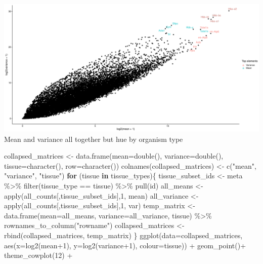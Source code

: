 \documentclass[
]{article}
\newenvironment{Shaded}{\begin{snugshade}}{\end{snugshade}}
\newcommand{\AttributeTok}[1]{\textcolor[rgb]{0.77,0.63,0.00}{#1}}
\newcommand{\ControlFlowTok}[1]{\textcolor[rgb]{0.13,0.29,0.53}{\textbf{#1}}}
\newcommand{\DecValTok}[1]{\textcolor[rgb]{0.00,0.00,0.81}{#1}}
\newcommand{\FunctionTok}[1]{\textcolor[rgb]{0.00,0.00,0.00}{#1}}
\newcommand{\NormalTok}[1]{#1}
\newcommand{\OtherTok}[1]{\textcolor[rgb]{0.56,0.35,0.01}{#1}}
\newcommand{\SpecialCharTok}[1]{\textcolor[rgb]{0.00,0.00,0.00}{#1}}
\newcommand{\StringTok}[1]{\textcolor[rgb]{0.31,0.60,0.02}{#1}}
\begin{document}
\includegraphics{Exploration_files/figure-latex/unnamed-chunk-15-1.pdf}
Mean and variance all together but hue by organism type

\begin{Shaded}
\begin{Highlighting}[]
\NormalTok{collapsed\_matrices }\OtherTok{\textless{}{-}} \FunctionTok{data.frame}\NormalTok{(}\AttributeTok{mean=}\FunctionTok{double}\NormalTok{(), }\AttributeTok{variance=}\FunctionTok{double}\NormalTok{(), }\AttributeTok{tissue=}\FunctionTok{character}\NormalTok{(), }\AttributeTok{row=}\FunctionTok{character}\NormalTok{())}
\FunctionTok{colnames}\NormalTok{(collapsed\_matrices) }\OtherTok{\textless{}{-}} \FunctionTok{c}\NormalTok{(}\StringTok{"mean"}\NormalTok{, }\StringTok{"variance"}\NormalTok{, }\StringTok{"tissue"}\NormalTok{)}
\ControlFlowTok{for}\NormalTok{ (tissue }\ControlFlowTok{in}\NormalTok{ tissue\_types)\{}
\NormalTok{  tissue\_subset\_ids }\OtherTok{\textless{}{-}}\NormalTok{ meta }\SpecialCharTok{\%\textgreater{}\%} \FunctionTok{filter}\NormalTok{(tissue\_type }\SpecialCharTok{==}\NormalTok{ tissue) }\SpecialCharTok{\%\textgreater{}\%} \FunctionTok{pull}\NormalTok{(id)}
\NormalTok{  all\_means }\OtherTok{\textless{}{-}} \FunctionTok{apply}\NormalTok{(all\_counts[,tissue\_subset\_ids],}\DecValTok{1}\NormalTok{, mean)}
\NormalTok{  all\_variance }\OtherTok{\textless{}{-}} \FunctionTok{apply}\NormalTok{(all\_counts[,tissue\_subset\_ids],}\DecValTok{1}\NormalTok{, var)}
\NormalTok{  temp\_matrix }\OtherTok{\textless{}{-}} \FunctionTok{data.frame}\NormalTok{(}\AttributeTok{mean=}\NormalTok{all\_means, }\AttributeTok{variance=}\NormalTok{all\_variance, tissue) }\SpecialCharTok{\%\textgreater{}\%} \FunctionTok{rownames\_to\_column}\NormalTok{(}\StringTok{"rowname"}\NormalTok{)}
\NormalTok{  collapsed\_matrices }\OtherTok{\textless{}{-}} \FunctionTok{rbind}\NormalTok{(collapsed\_matrices, temp\_matrix)}
\NormalTok{\}}
\FunctionTok{ggplot}\NormalTok{(}\AttributeTok{data=}\NormalTok{collapsed\_matrices, }\FunctionTok{aes}\NormalTok{(}\AttributeTok{x=}\FunctionTok{log2}\NormalTok{(mean}\SpecialCharTok{+}\DecValTok{1}\NormalTok{), }\AttributeTok{y=}\FunctionTok{log2}\NormalTok{(variance}\SpecialCharTok{+}\DecValTok{1}\NormalTok{), }\AttributeTok{colour=}\NormalTok{tissue)) }\SpecialCharTok{+} \FunctionTok{geom\_point}\NormalTok{()}\SpecialCharTok{+} \FunctionTok{theme\_cowplot}\NormalTok{(}\DecValTok{12}\NormalTok{) }\SpecialCharTok{+} 

\end{Highlighting}
\end{Shaded}
\end{document}
